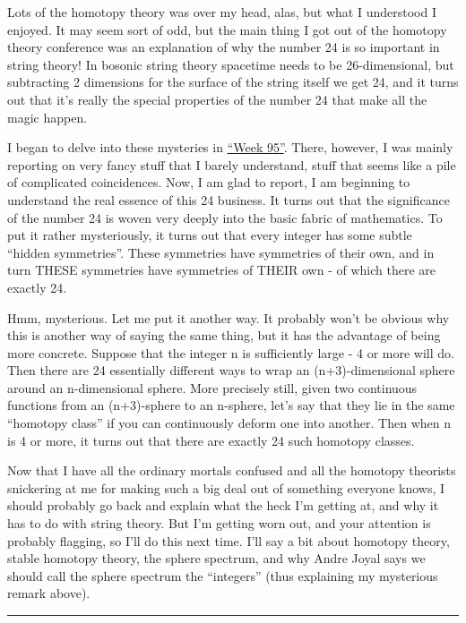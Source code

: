 \documentclass{article}
\begin{document}
Lots of the homotopy theory was over my head, alas, but what I
understood I enjoyed. It may seem sort of odd, but the main thing I got
out of the homotopy theory conference was an explanation of why the
number 24 is so important in string theory! In bosonic string theory
spacetime needs to be 26-dimensional, but subtracting 2 dimensions for
the surface of the string itself we get 24, and it turns out that it's
really the special properties of the number 24 that make all the magic
happen.

I began to delve into these mysteries in
\protect\hyperlink{week95}{``Week 95''}. There, however, I was mainly
reporting on very fancy stuff that I barely understand, stuff that seems
like a pile of complicated coincidences. Now, I am glad to report, I am
beginning to understand the real essence of this 24 business. It turns
out that the significance of the number 24 is woven very deeply into the
basic fabric of mathematics. To put it rather mysteriously, it turns out
that every integer has some subtle ``hidden symmetries''. These
symmetries have symmetries of their own, and in turn THESE symmetries
have symmetries of THEIR own - of which there are exactly 24.

Hmm, mysterious. Let me put it another way. It probably won't be obvious
why this is another way of saying the same thing, but it has the
advantage of being more concrete. Suppose that the integer n is
sufficiently large - 4 or more will do. Then there are 24 essentially
different ways to wrap an (n+3)-dimensional sphere around an
n-dimensional sphere. More precisely still, given two continuous
functions from an (n+3)-sphere to an n-sphere, let's say that they lie
in the same ``homotopy class'' if you can continuously deform one into
another. Then when n is 4 or more, it turns out that there are exactly
24 such homotopy classes.

Now that I have all the ordinary mortals confused and all the homotopy
theorists snickering at me for making such a big deal out of something
everyone knows, I should probably go back and explain what the heck I'm
getting at, and why it has to do with string theory. But I'm getting
worn out, and your attention is probably flagging, so I'll do this next
time. I'll say a bit about homotopy theory, stable homotopy theory, the
sphere spectrum, and why Andre Joyal says we should call the sphere
spectrum the ``integers'' (thus explaining my mysterious remark above).

\begin{center}\rule{0.5\linewidth}{0.5pt}\end{center}
\end{document}
